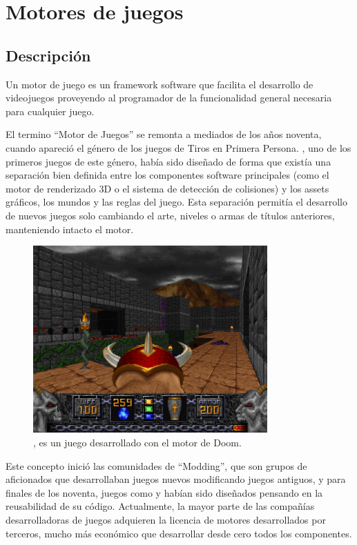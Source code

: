 \section{Motores de juegos}
\subsection{Descripción}
Un motor de juego es un framework software que facilita el desarrollo de videojuegos proveyendo al programador de la funcionalidad general necesaria para cualquier juego\cite{game_engine}.

El termino ``Motor de Juegos'' se remonta a mediados de los años noventa, cuando apareció el género de los juegos de Tiros en Primera Persona. , uno de los primeros juegos de este género, había sido diseñado de forma que existía una separación bien definida entre los componentes software principales (como el motor de renderizado 3D o el sistema de detección de colisiones) y los assets gráficos, los mundos y las reglas del juego. Esta separación permitía el desarrollo de nuevos juegos solo cambiando el arte, niveles o armas de títulos anteriores, manteniendo intacto el motor\cite{game_engine_architecture}.

\begin{figure}[h]
    \centering
    \includegraphics[width=0.8\textwidth]{images/estadodelarte/motores/heretic}
    \caption{, es un juego desarrollado con el motor de Doom.}
\end{figure}

Este concepto inició las comunidades de ``Modding'', que son grupos de aficionados que desarrollaban juegos nuevos modificando juegos antiguos, y para finales de los noventa, juegos como \cite{Quake_3} y \cite{unreal} habían sido diseñados pensando en la reusabilidad de su código. Actualmente, la mayor parte de las compañías desarrolladoras de juegos adquieren la licencia de motores desarrollados por terceros, mucho más económico que desarrollar desde cero todos los componentes.

